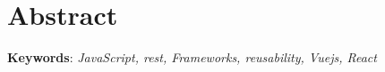 
\chapter{Abstract}

\lipsum[1]

\noindent \textbf{Keywords}: \textit{JavaScript, \acrshort{rest}, Frameworks, reusability, Vuejs, React}
